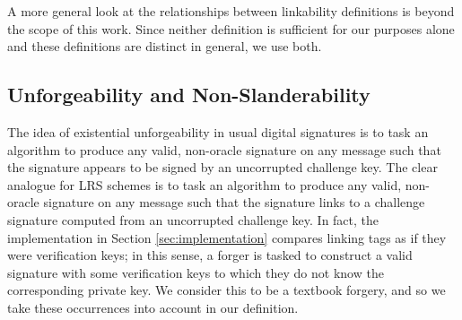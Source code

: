 \documentclass{llncs}
\begin{document}
A more general look at the relationships between linkability definitions is beyond the scope of this work. Since neither definition is sufficient for our purposes alone and these definitions are distinct in general, we use both.


\subsection{Unforgeability and Non-Slanderability}

The idea of existential unforgeability in usual digital signatures is to task an algorithm to produce any valid, non-oracle signature on any message such that the signature appears to be signed by an uncorrupted challenge key. The clear analogue for LRS schemes is to task an algorithm to produce any valid, non-oracle signature on any message such that the signature links to a challenge signature computed from an uncorrupted challenge key. In fact, the implementation in Section \ref{sec:implementation} compares linking tags as if they were verification keys; in this sense, a forger is tasked to construct a valid signature with some verification keys to which they do not know the corresponding private key. We consider this to be a textbook forgery, and so we take these occurrences into account in our definition.
\end{document}
